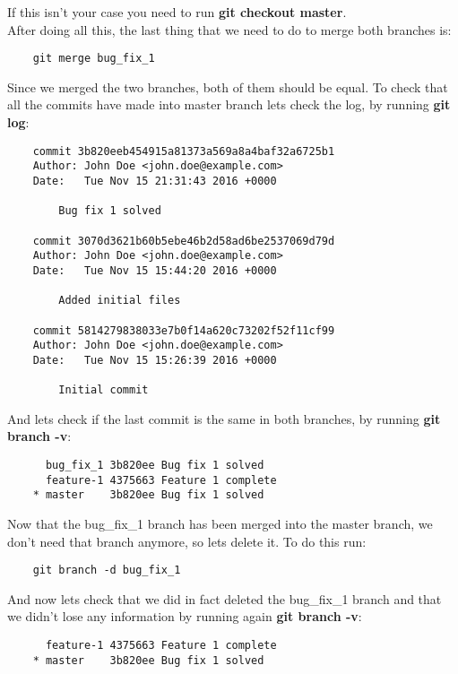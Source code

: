 \documentclass{article}
\begin{document}
If this isn't your case you need to run \textbf{git checkout master}.\\

After doing all this, the last thing that we need to do to merge both branches is:

\begin{lstlisting}
	git merge bug_fix_1
\end{lstlisting}

Since we merged the two branches, both of them should be equal. To check that all the commits have made into master branch lets check the log, by running \textbf{git log}:

\begin{lstlisting}
	commit 3b820eeb454915a81373a569a8a4baf32a6725b1
	Author: John Doe <john.doe@example.com>
	Date:   Tue Nov 15 21:31:43 2016 +0000

    	Bug fix 1 solved

	commit 3070d3621b60b5ebe46b2d58ad6be2537069d79d
	Author: John Doe <john.doe@example.com>
	Date:   Tue Nov 15 15:44:20 2016 +0000

    	Added initial files

	commit 5814279838033e7b0f14a620c73202f52f11cf99
	Author: John Doe <john.doe@example.com>
	Date:   Tue Nov 15 15:26:39 2016 +0000

    	Initial commit
\end{lstlisting}

And lets check if the last commit is the same in both branches, by running \textbf{git branch -v}:

\begin{lstlisting}
	  bug_fix_1 3b820ee Bug fix 1 solved
	  feature-1 4375663 Feature 1 complete
	* master    3b820ee Bug fix 1 solved
\end{lstlisting}

Now that the bug\_fix\_1 branch has been merged into the master branch, we don't need that branch anymore, so lets delete it. To do this run:

\begin{lstlisting}
	git branch -d bug_fix_1
\end{lstlisting}

And now lets check that we did in fact deleted the bug\_fix\_1 branch and that we didn't lose any information by running again \textbf{git branch -v}:

\begin{lstlisting}
	  feature-1 4375663 Feature 1 complete
	* master    3b820ee Bug fix 1 solved
\end{lstlisting}
\end{document}
